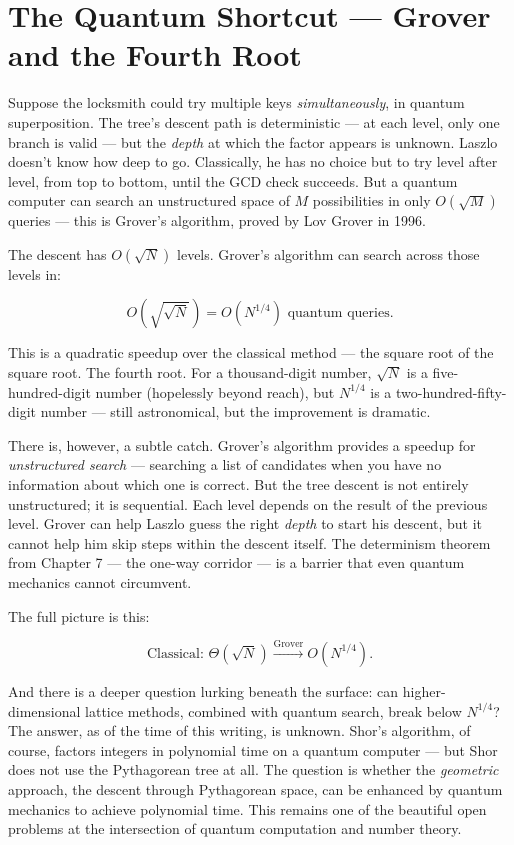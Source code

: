 \ornbreak



\section{The Quantum Shortcut --- Grover and the Fourth Root}


Suppose the locksmith could try multiple keys \textit{simultaneously}, in quantum superposition. The tree's descent path is deterministic --- at each level, only one branch is valid --- but the \textit{depth} at which the factor appears is unknown. Laszlo doesn't know how deep to go. Classically, he has no choice but to try level after level, from top to bottom, until the GCD check succeeds. But a quantum computer can search an unstructured space of $M$ possibilities in only $O(\sqrt{M})$ queries --- this is Grover's algorithm, proved by Lov Grover in 1996.

The descent has $O(\sqrt{N})$ levels. Grover's algorithm can search across those levels in:

\[
O\!\left(\sqrt{\sqrt{N}}\right) = O\!\left(N^{1/4}\right) \text{ quantum queries.}
\]

This is a quadratic speedup over the classical method --- the square root of the square root. The fourth root. For a thousand-digit number, $\sqrt{N}$ is a five-hundred-digit number (hopelessly beyond reach), but $N^{1/4}$ is a two-hundred-fifty-digit number --- still astronomical, but the improvement is dramatic.

There is, however, a subtle catch. Grover's algorithm provides a speedup for \textit{unstructured search} --- searching a list of candidates when you have no information about which one is correct. But the tree descent is not entirely unstructured; it is sequential. Each level depends on the result of the previous level. Grover can help Laszlo guess the right \textit{depth} to start his descent, but it cannot help him skip steps within the descent itself. The determinism theorem from Chapter 7 --- the one-way corridor --- is a barrier that even quantum mechanics cannot circumvent.

The full picture is this:

\[
\text{Classical: } \Theta(\sqrt{N}) \xrightarrow{\text{Grover}} O(N^{1/4}).
\]

And there is a deeper question lurking beneath the surface: can higher-dimensional lattice methods, combined with quantum search, break below $N^{1/4}$? The answer, as of the time of this writing, is unknown. Shor's algorithm, of course, factors integers in polynomial time on a quantum computer --- but Shor does not use the Pythagorean tree at all. The question is whether the \textit{geometric} approach, the descent through Pythagorean space, can be enhanced by quantum mechanics to achieve polynomial time. This remains one of the beautiful open problems at the intersection of quantum computation and number theory.

